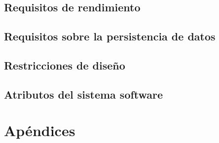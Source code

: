 \documentclass{article}
\begin{document}
\subsection{Requisitos de rendimiento}
\subsection{Requisitos sobre la persistencia de datos}
\subsection{Restricciones de diseño}
\subsection{Atributos del sistema software}

\section*{Apéndices}
\end{document}
